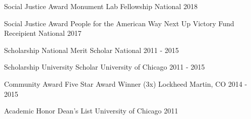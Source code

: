 
\begin{cventries}

  \cventry
    {Social Justice Award}
	{Monument Lab Fellowship}
	{National}
	{2018}
	{}

  \cventry
    {Social Justice Award}
	{People for the American Way Next Up Victory Fund Receipient}
	{National}
	{2017}
	{}

  \cventry
    {Scholarship} %
    {National Merit Scholar} %
    {National} %
    {2011 - 2015} %
    {}

  \cventry
    {Scholarship} %
    {University Scholar} %
    {University of Chicago} %
    {2011 - 2015} %
    {}
	
  \cventry
    {Community Award}
	{Five Star Award Winner (3x)}
	{Lockheed Martin, CO}
	{2014 - 2015}
	{}
	

  \cventry
    {Academic Honor} %
    {Dean's List} %
    {University of Chicago} %
    {2011} %
    {}

\end{cventries}